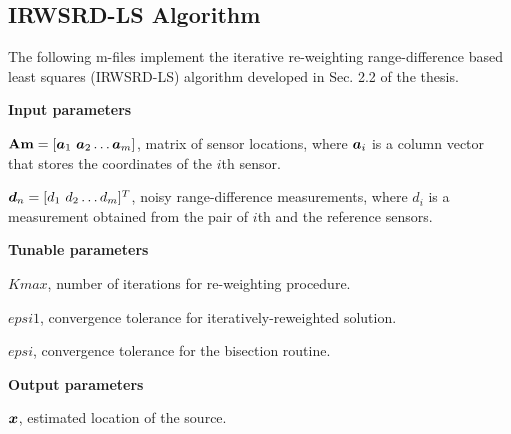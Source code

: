 \subsection{IRWSRD-LS Algorithm}

The following m-files implement the iterative re-weighting range-difference based least squares (IRWSRD-LS) algorithm developed in Sec. 2.2 of the thesis. 

\phantom{m}

\noindent
\textbf{Input parameters}

\noindent
$\mbox{\textbf{Am}} = [\mbox{\boldmath$a$}_1 \ \mbox{\boldmath$a$}_2 \ldots \mbox{\boldmath$a$}_m]$, matrix of sensor locations, where $\mbox{\boldmath$a$}_i$ is a column vector that stores the coordinates of the $i$th sensor.

\noindent
$\mbox{\boldmath$d$}_n = [d_1 \ d_2 \ldots d_m]^T$, noisy range-difference measurements, where $d_i$ is a measurement obtained from the pair of $i$th and the reference sensors.

\noindent
\textbf{Tunable parameters}

\noindent
$Kmax$, number of iterations for re-weighting procedure.

\noindent
$epsi1$, convergence tolerance for iteratively-reweighted solution.

\noindent
$epsi$, convergence tolerance for the bisection routine.

\noindent
\textbf{Output parameters}

\noindent
$\mbox{\boldmath$x$}$, estimated location of the source.

\phantom{m}

